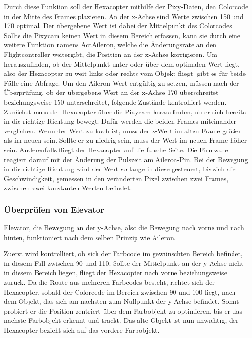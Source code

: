     Durch diese Funktion soll der Hexacopter mithilfe der Pixy-Daten, den Colorcode in der Mitte des Frames plazieren. An der x-Achse sind Werte zwischen 150 und 170 optimal. Der übergebene Wert ist dabei der Mittelpunkt des Colorcodes.
    Sollte die Pixycam keinen Wert in diesem Bereich erfassen, kann sie durch eine weitere Funktion namens ActAileron, welche die Änderungsrate an den Flightcontroller weitergibt, die Position an der x-Achse korrigieren.
    Um herauszufinden, ob der Mittelpunkt unter oder über dem optimalen Wert liegt, also der Hexacopter zu weit links oder rechts vom Objekt fliegt, gibt es für beide Fälle eine Abfrage.
    Um den Aileron Wert entgültig zu setzen, müssen nach der Überprüfung, ob der übergebene Wert an der x-Achse 170 überschreitet beziehungsweise 150 unterschreitet, folgende Zustände kontrolliert werden.
    Zunächst muss der Hexacopter über die Pixycam herausfinden, ob er sich bereits in die richtige Richtung bewegt. Dafür werden die beiden Frames miteinander verglichen. Wenn der Wert zu hoch ist, muss der x-Wert im alten Frame größer als im neuen sein. Sollte er zu niedrig sein, muss der Wert im neuen Frame höher sein.
    Anderenfalls fliegt der Hexacopter auf die falsche Seite. Die Firmware reagiert darauf mit der Änderung der Pulszeit am Aileron-Pin.
    Bei der Bewegung in die richtige Richtung wird der Wert so lange in diese gesteuert, bis sich die Geschwindigkeit, gemessen in den veränderten Pixel zwischen zwei Frames, zwischen zwei konstanten Werten befindet.

    \subsubsection{Überprüfen von Elevator}
    Elevator, die Bewegung an der y-Achse, also die Bewegung nach vorne und nach hinten, funktioniert nach dem selben Prinzip wie Aileron.

    Zuerst wird kontrolliert, ob sich der Farbcode im gewünschten Bereich befindet, in diesem Fall zwischen 90 und 110.
    Sollte der Mittelpunkt an der y-Achse nicht in diesem Bereich liegen, fliegt der Hexacopter nach vorne beziehungsweise zurück.
    Da die Route aus mehreren Farbcodes besteht, richtet sich der Hexacopter, sobald der Colorcode im Bereich zwischen 90 und 100 liegt, nach dem Objekt, das sich am nächsten zum Nullpunkt der y-Achse befindet. Somit probiert er die Position zentriert über dem Farbobjekt zu optimieren, bis er das nächste Farbobjekt erkennt und trackt. Das alte Objekt ist nun unwichtig, der Hexacopter bezieht sich auf das vordere Farbobjekt.

